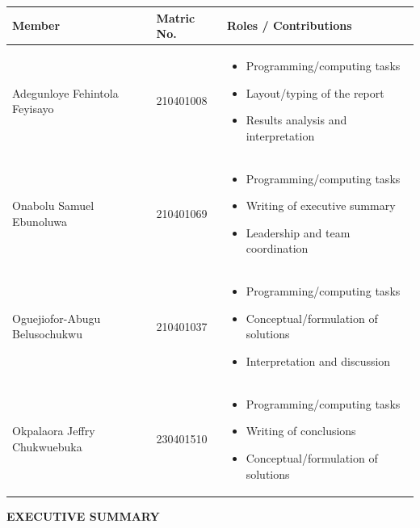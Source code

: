 \documentclass[12pt,a4paper]{article}
\begin{document}
\vspace{0.5cm}
\noindent\begin{tabular}{p{3.5cm}p{2.5cm}p{7.5cm}}
\toprule
\textbf{Member} & \textbf{Matric No.} & \textbf{Roles / Contributions} \\
\midrule
Adegunloye Fehintola Feyisayo & 210401008 &
\begin{itemize}[noitemsep,topsep=0pt,leftmargin=*]
  \item Programming/computing tasks
  \item Layout/typing of the report
  \item Results analysis and interpretation
\end{itemize} \\[0.2cm]
Onabolu Samuel Ebunoluwa & 210401069 &
\begin{itemize}[noitemsep,topsep=0pt,leftmargin=*]
  \item Programming/computing tasks
  \item Writing of executive summary
  \item Leadership and team coordination
\end{itemize} \\[0.2cm]
Oguejiofor-Abugu Belusochukwu & 210401037 &
\begin{itemize}[noitemsep,topsep=0pt,leftmargin=*]
  \item Programming/computing tasks
  \item Conceptual/formulation of solutions
  \item Interpretation and discussion
\end{itemize} \\[0.2cm]
Okpalaora Jeffry Chukwuebuka & 230401510 &
\begin{itemize}[noitemsep,topsep=0pt,leftmargin=*]
  \item Programming/computing tasks
  \item Writing of conclusions
  \item Conceptual/formulation of solutions
\end{itemize} \\
\bottomrule
\end{tabular}

\newpage
\begin{center}
  {\large \textbf{EXECUTIVE SUMMARY}}
\end{center}
\end{document}
